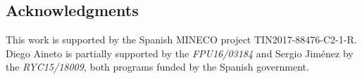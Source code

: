 \documentclass[runningheads]{llncs}
\begin{document}
\subsection*{Acknowledgments}
This work is supported by the Spanish MINECO project TIN2017-88476-C2-1-R. Diego Aineto is partially supported by the {\it FPU16/03184} and Sergio Jim\'enez by the {\it RYC15/18009}, both programs funded by the Spanish government.



\end{document}
